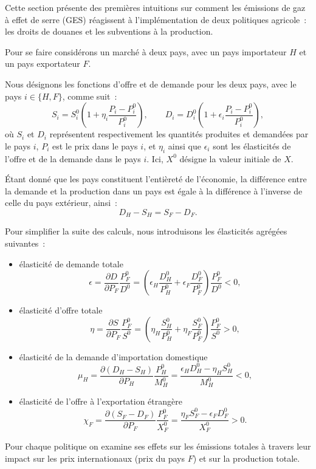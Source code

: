 Cette section présente des premières intuitions sur comment les émissions de gaz à effet de serre (GES) réagissent à l'implémentation de deux politiques agricole~: les droits de douanes et les subventions à la production.

Pour se faire considérons un marché à deux pays, avec un pays importateur $H$ et un pays exportateur $F$.

Nous désignons les fonctions d'offre et de demande pour les deux pays, avec le pays $i \in \{H, F\}$, comme suit~:
$$
    S_i = S_i^0\left(1 + \eta_i\frac{P_i - P_i^0}{P_i^0}\right), \qquad
    D_i = D_i^0\left(1 + \epsilon_i\frac{P_i - P_i^0}{P_i^0}\right),
$$
où $S_i$ et $D_i$ représentent respectivement les quantités produites et demandées par le pays $i$, $P_i$ est le prix dans le pays $i$, et $\eta_i$ ainsi que $\epsilon_i$ sont les élasticités de l'offre et de la demande dans le pays $i$. Ici, $X^0$ désigne la valeur initiale de $X$.

Étant donné que les pays constituent l'entièreté de l'économie, la différence entre la demande et la production dans un pays est égale à la différence à l'inverse de celle du pays extérieur, ainsi~:
$$
    D_H - S_H = S_F - D_F.
$$

Pour simplifier la suite des calculs, nous introduisons les élasticités agrégées suivantes~:
\begin{itemize}
    \item élasticité de demande totale
          $$
              \epsilon = \frac{\partial D}{\partial P_F} \frac{P_F^0}{D^0} = \left( \epsilon_H \frac{D_H^0}{P_H^0} + \epsilon_F \frac{D_F^0}{P_F^0} \right)\frac{P_F^0}{D^0} < 0,
          $$
    \item élasticité d'offre totale
          $$
              \eta = \frac{\partial S}{\partial P_F} \frac{P_F^0}{S^0} = \left( \eta_H \frac{S_H^0}{P_H^0} + \eta_F \frac{S_F^0}{P_F^0} \right)\frac{P_F^0}{S^0} > 0,
          $$
    \item élasticité de la demande d'importation domestique
          $$
              \mu_H = \frac{\partial (D_H - S_H)}{\partial P_H} \frac{P_H^0}{M_H^0} = \frac{\epsilon_H D_H^0 - \eta_H S_H^0}{M_H^0} < 0,
          $$
    \item élasticité de l'offre à l'exportation étrangère
          $$
              \chi_F = \frac{\partial (S_F - D_F)}{\partial P_F} \frac{P_F^0}{X_F^0} = \frac{\eta_F S_F^0 - \epsilon_F D_F^0}{X_F^0} > 0.
          $$
\end{itemize}

Pour chaque politique on examine ses effets sur les émissions totales à travers leur impact sur les prix internationaux (prix du pays $F$) et sur la production totale.

